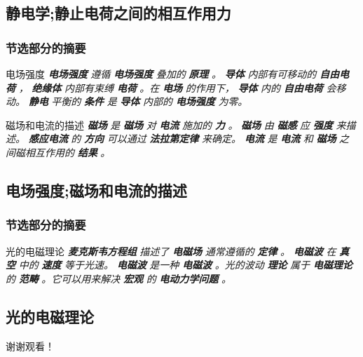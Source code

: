 \documentclass{beamer}%
\begin{document}
\subsection{静电学;静止电荷之间的相互作用力}%
\begin{frame}%
\frametitle{\textsc{节选部分的摘要}}%
\begin{block}{电场强度}%
\textit{}%
\textbf{\textit{电场强度}}%
\textit{遵循}%
\textbf{\textit{电场强度}}%
\textit{叠加的}%
\textbf{\textit{原理}}%
\textit{。}%
\textbf{\textit{导体}}%
\textit{内部有可移动的}%
\textbf{\textit{自由电荷}}%
\textit{，}%
\textbf{\textit{绝缘体}}%
\textit{内部有束缚}%
\textbf{\textit{电荷}}%
\textit{。在}%
\textbf{\textit{电场}}%
\textit{的作用下，}%
\textbf{\textit{导体}}%
\textit{内的}%
\textbf{\textit{自由电荷}}%
\textit{会移动。}%
\textbf{\textit{静电}}%
\textit{平衡的}%
\textbf{\textit{条件}}%
\textit{是}%
\textbf{\textit{导体}}%
\textit{内部的}%
\textbf{\textit{电场强度}}%
\textit{为零。}%
\end{block}%
\begin{alertblock}{磁场和电流的描述}%
\textit{}%
\textbf{\textit{磁场}}%
\textit{是}%
\textbf{\textit{磁场}}%
\textit{对}%
\textbf{\textit{电流}}%
\textit{施加的}%
\textbf{\textit{力}}%
\textit{。}%
\textbf{\textit{磁场}}%
\textit{由}%
\textbf{\textit{磁感}}%
\textit{应}%
\textbf{\textit{强度}}%
\textit{来描述。}%
\textbf{\textit{感应电流}}%
\textit{的}%
\textbf{\textit{方向}}%
\textit{可以通过}%
\textbf{\textit{法拉第定律}}%
\textit{来确定。}%
\textbf{\textit{电流}}%
\textit{是}%
\textbf{\textit{电流}}%
\textit{和}%
\textbf{\textit{磁场}}%
\textit{之间磁相互作用的}%
\textbf{\textit{结果}}%
\textit{。}%
\end{alertblock}%
\end{frame}%
\subsection{电场强度;磁场和电流的描述}%
\begin{frame}%
\frametitle{\textsc{节选部分的摘要}}%
\begin{block}{光的电磁理论}%
\textit{}%
\textbf{\textit{麦克斯韦方程组}}%
\textit{描述了}%
\textbf{\textit{电磁场}}%
\textit{通常遵循的}%
\textbf{\textit{定律}}%
\textit{。}%
\textbf{\textit{电磁波}}%
\textit{在}%
\textbf{\textit{真空}}%
\textit{中的}%
\textbf{\textit{速度}}%
\textit{等于光速。}%
\textbf{\textit{电磁波}}%
\textit{是一种}%
\textbf{\textit{电磁波}}%
\textit{。光的波动}%
\textbf{\textit{理论}}%
\textit{属于}%
\textbf{\textit{电磁理论}}%
\textit{的}%
\textbf{\textit{范畴}}%
\textit{。它可以用来解决}%
\textbf{\textit{宏观}}%
\textit{的}%
\textbf{\textit{电动力学问题}}%
\textit{。}%
\end{block}%
\subsection{光的电磁理论}%
\end{frame}%
\begin{frame}%
\Huge{\centerline{谢谢观看！}}%
\end{frame}%
\end{document}
